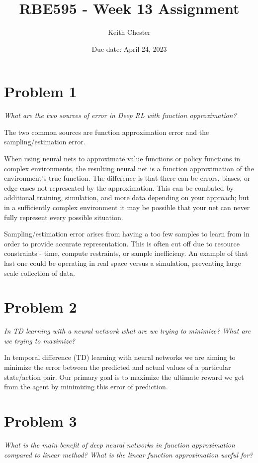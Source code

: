 \documentclass{article}
\title{RBE595 - Week 13 Assignment}
\author{Keith Chester}
\date{Due date: April 24, 2023}
\begin{document}
\maketitle

\section*{Problem 1}
\textit{What are the two sources of error in Deep RL with function approximation?}

The two common sources are function approximation error and the sampling/estimation error.

When using neural nets to approximate value functions or policy functions in complex environments, the resulting neural net is a function approximation of the environment's true function. The difference is that there can be errors, biases, or edge cases not represented by the approximation. This can be combated by additional training, simulation, and more data depending on your approach; but in a sufficiently complex environment it may be possible that your net can never fully represent every possible situation.

Sampling/estimation error arises from having a too few samples to learn from in order to provide accurate representation. This is often cut off due to resource constraints - time, compute restraints, or sample inefficieny. An example of that last one could be operating in real space versus a simulation, preventing large scale collection of data.

\section*{Problem 2}
\textit{In TD learning with a neural network what are we trying to minimize? What are we trying to maximize?}

In temporal difference (TD) learning with neural networks we are aiming to minimize the error between the predicted and actual values of a particular state/action pair. Our primary goal is to maximize the ultimate reward we get from the agent by minimizing this error of prediction.


\section*{Problem 3}
\textit{What is the main benefit of deep neural networks in function approximation compared to linear method? What is the linear function approximation useful for?}
\end{document}

